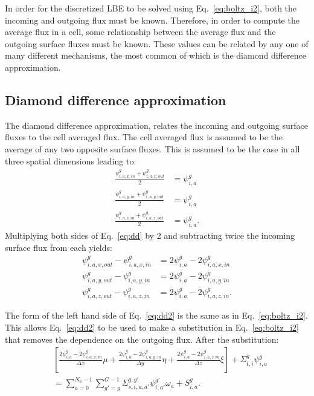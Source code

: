 In order for the discretized LBE to be solved using Eq.~\ref{eq:boltz_i2}, both the incoming and outgoing flux must be known. Therefore, in order to compute the average flux in a cell, some relationship between the average flux and the outgoing surface fluxes must be known. These values can be related by any one of many different mechanisms, the most common of which is the diamond difference approximation.

\subsection{Diamond difference approximation}

The diamond difference approximation, relates the incoming and outgoing surface fluxes to the cell averaged flux. The cell averaged flux is assumed to be the average of any two opposite surface fluxes. This is assumed to be the case in all three spatial dimensions leading to:
\begin{equation} \label{eq:dd}
\begin{split}
\frac{\psi_{i,a,x,in}^g + \psi_{i,a,x,out}^g}{2} &= \psi_{i,a}^{g} \\
\frac{\psi_{i,a,y,in}^g + \psi_{i,a,y,out}^g}{2} &= \psi_{i,a}^{g} \\
\frac{\psi_{i,a,z,in}^g + \psi_{i,a,z,out}^g}{2} &= \psi_{i,a}^{g}.
\end{split}
\end{equation}
Multiplying both sides of Eq.~\ref{eq:dd} by 2 and subtracting twice the incoming surface flux from each yields:
\begin{equation} \label{eq:dd2}
\begin{split}
\psi_{i,a,x,out}^g - \psi_{i,a,x,in}^g &= 2\psi_{i,a}^{g} - 2\psi_{i,a,x,in}^g \\
\psi_{i,a,y,out}^g - \psi_{i,a,y,in}^g &= 2\psi_{i,a}^{g} - 2\psi_{i,a,y,in}^g \\
\psi_{i,a,z,out}^g - \psi_{i,a,z,in}^g &= 2\psi_{i,a}^{g} - 2\psi_{i,a,z,in}^g.
\end{split}
\end{equation}

The form of the left hand side of Eq.~\ref{eq:dd2} is the same as in Eq.~\ref{eq:boltz_i2}. This allows Eq.~\ref{eq:dd2} to be used to make a substitution in Eq.~\ref{eq:boltz_i2} that removes the dependence on the outgoing flux. After the substitution:
\begin{equation} \label{eq:boltz_i3}
\begin{split}
&\left[ 
\frac{2\psi_{i,a}^{g} - 2\psi_{i,a,x,in}^g}{\Delta x} \mu + 
\frac{2\psi_{i,a}^{g} - 2\psi_{i,a,y,in}^g}{\Delta y} \eta + 
\frac{2\psi_{i,a}^{g} - 2\psi_{i,a,z,in}^g}{\Delta z} \xi
\right]
+ \Sigma_{t,i}^g \psi_{i,a}^{g} \\
& = 
\sum_{a=0}^{N_a-1} \sum_{g'=g}^{G-1} \Sigma_{s, i, a, a'}^{g, g'} \psi_{i, a'}^{g'} \omega_a + S_{i,a}^g.
\end{split}
\end{equation}

